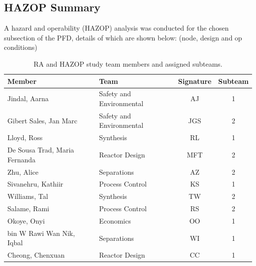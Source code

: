 

\subsection{HAZOP Summary}

A hazard and operability (HAZOP) analysis was conducted for the chosen subsection of the PFD, details of which are shown below: (node, design and op conditions)

\begin{table}[htbp]
    \centering
    \caption{RA and HAZOP study team members and assigned subteams.}
    \label{tab:ra_hazop_team}
    \small
    \begin{tabularx}{\textwidth}{|>{\raggedright\arraybackslash}X|>{\raggedright\arraybackslash}X|c|c|}
        \hline
        \textbf{Member}               & \textbf{Team}            & \textbf{Signature} & \textbf{Subteam} \\
        \hline
        Jindal, Aarna                 & Safety and Environmental & AJ                 & 1                \\
        \hline
        Gibert Sales, Jan Marc        & Safety and Environmental & JGS                & 2                \\
        \hline
        Lloyd, Ross                   & Synthesis                & RL                 & 1                \\
        \hline
        De Sousa Trad, Maria Fernanda & Reactor Design           & MFT                & 2                \\
        \hline
        Zhu, Alice                    & Separations              & AZ                 & 2                \\
        \hline
        Sivanehru, Kathiir            & Process Control          & KS                 & 1                \\
        \hline
        Williams, Tal                 & Synthesis                & TW                 & 2                \\
        \hline
        Salame, Rami                  & Process Control          & RS                 & 2                \\
        \hline
        Okoye, Onyi                   & Economics                & OO                 & 1                \\
        \hline
        bin W Rawi Wan Nik, Iqbal     & Separations              & WI                 & 1                \\
        \hline
        Cheong, Chenxuan              & Reactor Design           & CC                 & 1                \\
        \hline
    \end{tabularx}
    \normalsize
\end{table}

